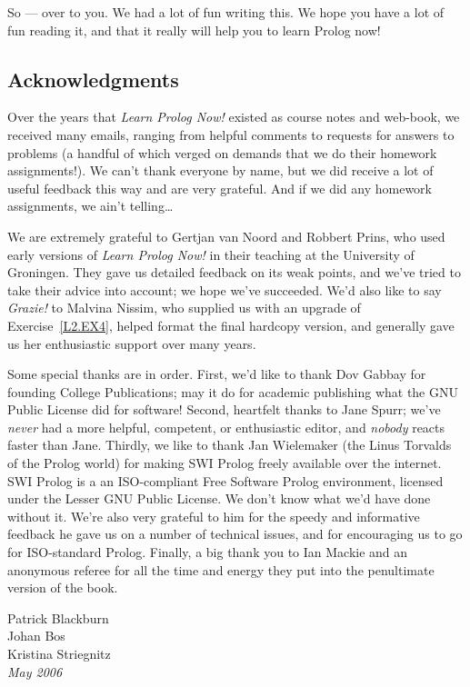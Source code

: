 So --- over to you. We had a lot of fun writing this. We hope you have
a lot of fun reading it, and that it really will help you to learn
Prolog now!

\subsection*{Acknowledgments}

Over the years that \textit{Learn Prolog Now!} existed as course notes
and web-book, we received many emails, ranging from helpful comments to
requests for answers to problems (a handful of which verged on demands
that we do their homework assignments!). We can't thank everyone by name,
but we did receive a lot of useful feedback this way and are very
grateful. And if we did any homework assignments, we ain't
telling\ldots

We are extremely grateful to Gertjan van Noord and Robbert Prins, who
used early versions of \textit{Learn Prolog Now!} in their teaching at
the University of Groningen. They gave us detailed feedback on its
weak points, and we've tried to take their advice into account; we
hope we've succeeded. We'd also like to say \textit{Grazie!} to
Malvina Nissim, who supplied us with an upgrade of
Exercise~\ref{L2.EX4}, helped format the final hardcopy version, and
generally gave us her enthusiastic support over many years.

Some special thanks are in order. First, we'd like to thank Dov Gabbay
for founding College Publications; may it do for academic publishing
what the GNU Public License did for software!  Second, heartfelt
thanks to Jane Spurr; we've \textit{never} had a more helpful,
competent, or enthusiastic editor, and \textit{nobody} reacts faster
than Jane. Thirdly, we like to thank Jan Wielemaker (the Linus
Torvalds of the Prolog world) for making SWI Prolog freely available
over the internet.  SWI Prolog is a an ISO-compliant Free Software
Prolog environment, licensed under the Lesser GNU Public License.  We
don't know what we'd have done without it. We're also very grateful to
him for the speedy and informative feedback he gave us on a number of
technical issues, and for encouraging us to go for ISO-standard
Prolog.  Finally, a big thank you to Ian Mackie and an anonymous
referee for all the time and energy they put into the penultimate version
of the book.

\begin{flushright}
Patrick Blackburn\\
Johan Bos\\
Kristina Striegnitz\\
\textit{May 2006}
\end{flushright}

